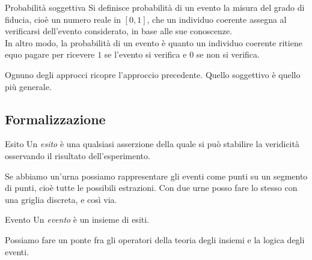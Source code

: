 \documentclass[a4paper]{article}
\begin{document}
\begin{radioactive}
    \begin{snippetdefinition}{Probabilità soggettiva}
        Si definisce probabilità di un evento
        la misura del grado di fiducia, cioè un numero reale in \([0,1]\),
        che un individuo coerente
        assegna al verificarsi dell'evento considerato, in base alle sue conoscenze. \\
        In altro modo, la probabilità di un evento è quanto un individuo coerente ritiene equo pagare
        per ricevere \(1\) se l'evento si verifica e \(0\) se non si verifica.
    \end{snippetdefinition}
\end{radioactive}

\begin{radioactive}
    Ognuno degli approcci ricopre l'approccio precedente.
    Quello soggettivo è quello più generale.
\end{radioactive}

\subsection{Formalizzazione}

\begin{radioactive}
    \begin{snippetdefinition}{Esito}
        Un \emph{esito} è una qualsiasi asserzione
        della quale si può stabilire la veridicità
        osservando il risultato dell'esperimento.
    \end{snippetdefinition}
\end{radioactive}

\begin{radioactive}
    Se abbiamo un'urna possiamo rappresentare
    gli eventi come punti su un segmento di punti, cioè tutte le possibili estrazioni.
    Con due urne posso fare lo stesso con una griglia discreta, e così via.
\end{radioactive}

\begin{radioactive}
    \begin{snippetdefinition}{Evento}
        Un \emph{evento} è un insieme di esiti.
    \end{snippetdefinition}
\end{radioactive}

Possiamo fare un ponte fra gli operatori della teoria degli insiemi e
la logica degli eventi.
\end{document}
